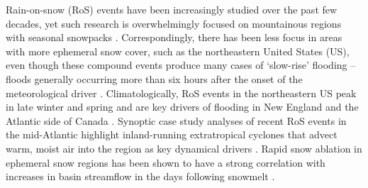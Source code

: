 \documentclass[nhess, manuscript]{copernicus}
\begin{document}

%
%
%
%


\introduction

Rain-on-snow (RoS) events have been increasingly studied over the past few decades, yet such research is overwhelmingly focused on mountainous regions with seasonal snowpacks \citep{singh1997hydrological,mccabe2007rain,wayand2015modeling,sterle2019hydroclimate,musselman2018projected,poschlod2020climate,Hatchett2021,siirila2021a,heggli2022toward,yu2022diverse,brandt2022a,maina2023diverging,haleakala2023watershed}.
Correspondingly, there has been less focus in areas with more ephemeral snow cover, such as the northeastern United States (US), even though these compound events produce many cases of `slow-rise' flooding -- floods generally occurring more than six hours after the onset of the meteorological driver \citep{dougherty2021high}.
Climatologically, RoS events in the northeastern US peak in late winter and spring \citep{ashley2008flood,villarini2010flood,dougherty2019climatology,wachowicz2020rain} and are key drivers of flooding in New England and the Atlantic side of Canada \citep{collins2014annual}.
Synoptic case study analyses of recent RoS events in the mid-Atlantic highlight inland-running extratropical cyclones that advect warm, moist air into the region as key dynamical drivers \citep{grote2021synoptic,suriano2023atmospheric}.
Rapid snow ablation in ephemeral snow regions has been shown to have a strong correlation with increases in basin streamflow in the days following snowmelt \citep{suriano2020discharge,suriano2023atmospheric}. %
\end{document}
